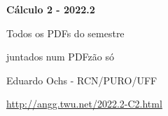 \documentclass[oneside,12pt]{article}
\begin{document}

\def\u#1{\par{\footnotesize \url{#1}}}

\def\drafturl{http://angg.twu.net/LATEX/2022-2-C2.pdf}
\def\drafturl{http://angg.twu.net/2022.2-C2.html}
\def\draftfooter{\tiny \href{\drafturl}{\jobname{}} \ColorBrown{\shorttoday{} \hours}}



%

\thispagestyle{empty}

\begin{center}

\vspace*{1.2cm}

{\bf \Large Cálculo 2 - 2022.2}

\bsk

Todos os PDFs do semestre

juntados num PDFzão só

\bsk

Eduardo Ochs - RCN/PURO/UFF

\url{http://angg.twu.net/2022.2-C2.html}

\end{center}

\newpage

\def\incl#1{}

\incl{2022-2-C2-buraco}

\incl{2022-2-C2-mathologermovel}

\incl{2022-2-C2-int-por-partes}

\incl{2022-2-C2-fracoes-parciais}
\end{document}
